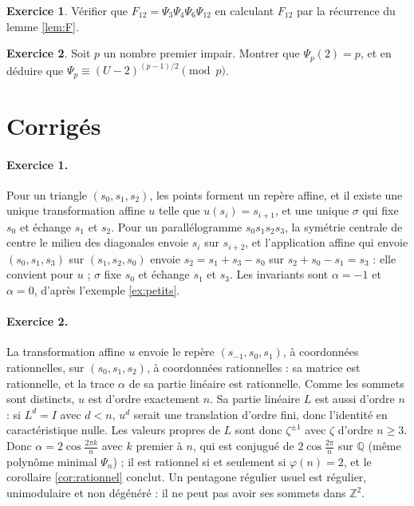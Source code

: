 \documentclass[11pt,a4paper]{article}
\theoremstyle{plain}
\theoremstyle{definition}
\newtheorem{exercice}{Exercice}
\theoremstyle{remark}
\newcommand{\Z}{\mathbb{Z}}
\newcommand{\Q}{\mathbb{Q}}
\begin{document}
\begin{exercice}\label{exo:douze}
Vérifier que $F_{12}=\Psi_3\Psi_4\Psi_6\Psi_{12}$ en calculant $F_{12}$ par la récurrence du lemme \ref{lem:F}.
\end{exercice}

\begin{exercice}\label{exo:ramification}
Soit $p$ un nombre premier impair. Montrer que $\Psi_p(2)=p$, et en déduire que $\Psi_p\equiv(U-2)^{(p-1)/2}\pmod p$.
\end{exercice}

\section{Corrigés}

\paragraph{Exercice 1.} Pour un triangle $(s_0,s_1,s_2)$, les points forment un repère affine, et il existe une unique transformation affine $u$ telle que $u(s_i)=s_{i+1}$, et une unique $\sigma$ qui fixe $s_0$ et échange $s_1$ et $s_2$. Pour un parallélogramme $s_0s_1s_2s_3$, la symétrie centrale de centre le milieu des diagonales envoie $s_i$ sur $s_{i+2}$, et l'application affine qui envoie $(s_0,s_1,s_3)$ sur $(s_1,s_2,s_0)$ envoie $s_2=s_1+s_3-s_0$ sur $s_2+s_0-s_1=s_3$ : elle convient pour $u$ ; $\sigma$ fixe $s_0$ et échange $s_1$ et $s_3$. Les invariants sont $\alpha=-1$ et $\alpha=0$, d'après l'exemple \ref{ex:petits}.

\paragraph{Exercice 2.} La transformation affine $u$ envoie le repère $(s_{-1},s_0,s_1)$, à coordonnées rationnelles, sur $(s_0,s_1,s_2)$, à coordonnées rationnelles : sa matrice est rationnelle, et la trace $\alpha$ de sa partie linéaire est rationnelle. Comme les sommets sont distincts, $u$ est d'ordre exactement $n$. Sa partie linéaire $L$ est aussi d'ordre $n$ : si $L^d=I$ avec $d<n$, $u^d$ serait une translation d'ordre fini, donc l'identité en caractéristique nulle. Les valeurs propres de $L$ sont donc $\zeta^{\pm1}$ avec $\zeta$ d'ordre $n\geq3$. Donc $\alpha=2\cos\frac{2\pi k}n$ avec $k$ premier à $n$, qui est conjugué de $2\cos\frac{2\pi}n$ sur $\Q$ (même polynôme minimal $\Psi_n$) ; il est rationnel si et seulement si $\varphi(n)=2$, et le corollaire \ref{cor:rationnel} conclut. Un pentagone régulier usuel est régulier, unimodulaire et non dégénéré : il ne peut pas avoir ses sommets dans $\Z^2$.
\end{document}
